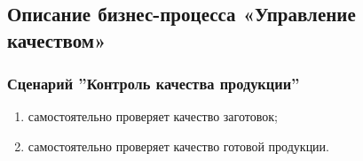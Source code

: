 

\subsection{Описание бизнес-процесса «Управление качеством»}
\label{bp:quality}

\subsubsection{Сценарий ''Контроль качества продукции''}
\label{bp:quality_1}

\begin{enumerate}

\item \gaoperator самостоятельно проверяет качество заготовок;

\item \operator самостоятельно проверяет качество готовой продукции.



\end{enumerate}